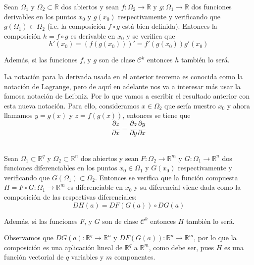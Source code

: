             \begin{teorema}
                Sean $\Omega_1$ y $\Omega_2 \subset \mathbb{R}$ dos abiertos y sean $f:\Omega_2 \rightarrow \mathbb{R}$ y $g:\Omega_1 \rightarrow \mathbb{R}$ dos funciones derivables en los puntos $x_0$ y $g(x_0)$ respectivamente y verificando que $g(\Omega_1) \subset \Omega_2$ (i.e. la composición $f\circ g$ está bien definida). Entonces la composición $h = f\circ g$ es derivable en $x_0$ y se verifica que $$h'(x_0) = (f(g(x_0)))' = f'(g(x_0))g'(x_0)$$
                
                Además, si las funciones $f$, y $g$ son de clase $\mathcal{C}^k$ entonces $h$ también lo será.
            \end{teorema}
        
        La notación para la derivada usada en el anterior teorema es conocida como la notación de Lagrange, pero de aquí en adelante nos va a interesar más usar la famosa notación de Leibniz. Por lo que vamos a escribir el resultado anterior con esta nueva notación. Para ello, consideramos $x \in \Omega_2$ que sería nuestro $x_0$ y ahora llamamos $y = g(x)$ y $z = f(g(x))$, entonces se tiene que $$\frac{\partial z}{\partial x} = \frac{\partial z }{\partial y}\frac{\partial y}{\partial x}$$ \\
        
            \begin{teorema}
             Sean $\Omega_1 \subset \mathbb{R}^q$ y $\Omega_2 \subset \mathbb{R}^n$ dos abiertos y sean $F:\Omega_2 \rightarrow \mathbb{R}^m$ y $G:\Omega_1 \rightarrow \mathbb{R}^n$ dos funciones diferenciables en los puntos $x_0 \in \Omega_1$ y $G(x_0)$ respectivamente y verificando que $G(\Omega_1) \subset \Omega_2$. Entonces se verifica que la función compuesta $H = F\circ G: \Omega_1 \rightarrow \mathbb{R}^m$ es diferenciable en $x_0$ y su diferencial viene dada como la composición de las respectivas diferenciales: 
             \begin{equation}\label{eq:CR2}
                DH(a) = DF(G(a)) \circ DG(a)
             \end{equation}
              
             
             Además, si las funciones $F$, y $G$ son de clase $\mathcal{C}^k$ entonces $H$ también lo será. 
            \end{teorema}
            
        Observamos que $DG(a):\mathbb{R}^q  \rightarrow \mathbb{R}^n$ y $DF(G(a)): \mathbb{R}^n \rightarrow \mathbb{R}^m$, por lo que la composición es una aplicación lineal de $\mathbb{R}^q$ a $\mathbb{R}^m$, como debe ser, pues $H$ es una función vectorial de $q$ variables y $m$ componentes. \\
        
